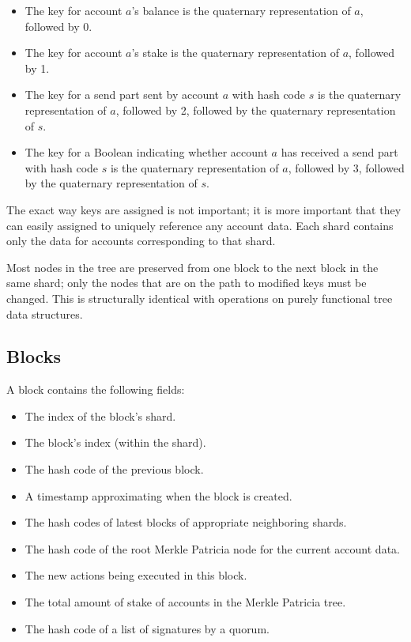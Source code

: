 \documentclass{article}
\begin{document}
\begin{itemize}
  \item The key for account $a$'s balance is the quaternary representation of $a$, followed by 0.
  \item The key for account $a$'s stake is the quaternary representation of $a$, followed by 1.
  \item The key for a send part sent by account $a$ with hash code $s$ is the quaternary representation of $a$, followed by 2, followed by the quaternary representation of $s$.
  \item The key for a Boolean indicating whether account $a$ has received a send part with hash code $s$ is the quaternary representation of $a$, followed by 3, followed by the quaternary representation of $s$.
\end{itemize}

The exact way keys are assigned is not important; it is more important that
they can easily assigned to uniquely reference any account data.  Each shard
contains only the data for accounts corresponding to that shard.

Most nodes in the tree are preserved from one block to the next block in the same shard;
only the nodes that are on the path to modified keys must be changed.  This is
structurally identical with operations on purely functional tree data structures.

\subsection{Blocks}

A block contains the following fields:

\begin{itemize}
  \item The index of the block's shard.
  \item The block's index (within the shard).
  \item The hash code of the previous block.
  \item A timestamp approximating when the block is created.
  \item The hash codes of latest blocks of appropriate neighboring shards.
  \item The hash code of the root Merkle Patricia node for the current account data.
  \item The new actions being executed in this block.
  \item The total amount of stake of accounts in the Merkle Patricia tree.
  \item The hash code of a list of signatures by a quorum.
\end{itemize}
\end{document}
